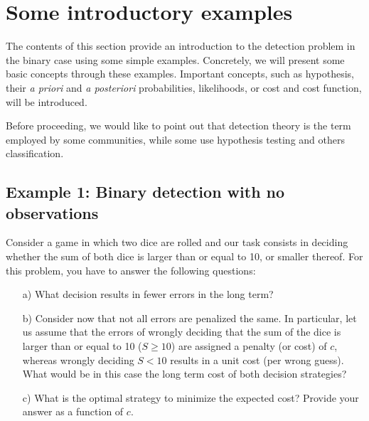 \section{Some introductory examples}
\label{sec:M2}

The contents of this section provide an introduction to the detection problem in the binary case using some simple examples. Concretely, we will present some basic concepts through these examples. Important concepts, such as hypothesis, their {\em a priori} and {\em a posteriori} probabilities, likelihoods, or cost and cost function, will be introduced.

Before proceeding, we would like to point out that detection theory is the term employed by some communities, while some use hypothesis testing and others classification.

\subsection{Example 1: Binary detection with no observations}
\label{subsec:example1}

\begin{problem}
Consider a game in which two dice are rolled and our task consists in deciding whether the sum of both dice is larger than or equal to 10, or smaller thereof. For this problem, you have to answer the following questions:
    \begin{itemize}
        \item[a)] What decision results in fewer errors in the long term?
        \item[b)] Consider now that not all errors are penalized the same. In particular, let us assume that the errors of wrongly deciding that the sum of the dice is larger than or equal to 10 ($S\geq 10$) are assigned a penalty (or cost) of $c$, whereas wrongly deciding $S<10$ results in a unit cost (per wrong guess). What would be in this case the long term cost of both decision strategies?
        \item[c)] What is the optimal strategy to minimize the expected cost? Provide your answer as a function of $c$.
    \end{itemize}
\end{problem}


